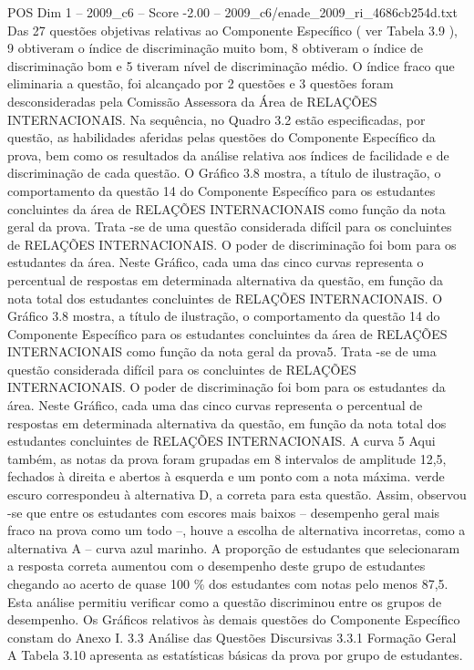 \begin{textsample}{POS Dim 1 – 2009\_c6 – Score -2.00 – 2009\_c6/enade\_2009\_ri\_4686cb254d.txt}
Das 27 questões objetivas relativas ao Componente Específico ( ver Tabela 3.9 ), 9 obtiveram o índice de discriminação muito bom, 8 obtiveram o índice de discriminação bom e 5 tiveram nível de discriminação médio.
O índice fraco que eliminaria a questão, foi alcançado por 2 questões e 3 questões foram desconsideradas pela Comissão Assessora da Área de RELAÇÕES INTERNACIONAIS.
Na sequência, no Quadro 3.2 estão especificadas, por questão, as habilidades aferidas pelas questões do Componente Específico da prova, bem como os resultados da análise relativa aos índices de facilidade e de discriminação de cada questão.
O Gráfico 3.8 mostra, a título de ilustração, o comportamento da questão 14 do Componente Específico para os estudantes concluintes da área de RELAÇÕES INTERNACIONAIS como função da nota geral da prova.
Trata -se de uma questão considerada difícil para os concluintes de RELAÇÕES INTERNACIONAIS.
O poder de discriminação foi bom para os estudantes da área.
Neste Gráfico, cada uma das cinco curvas representa o percentual de respostas em determinada alternativa da questão, em função da nota total dos estudantes concluintes de RELAÇÕES INTERNACIONAIS.
O Gráfico 3.8 mostra, a título de ilustração, o comportamento da questão 14 do Componente Específico para os estudantes concluintes da área de RELAÇÕES INTERNACIONAIS como função da nota geral da prova5.
Trata -se de uma questão considerada difícil para os concluintes de RELAÇÕES INTERNACIONAIS.
O poder de discriminação foi bom para os estudantes da área.
Neste Gráfico, cada uma das cinco curvas representa o percentual de respostas em determinada alternativa da questão, em função da nota total dos estudantes concluintes de RELAÇÕES INTERNACIONAIS.
A curva 5 Aqui também, as notas da prova foram grupadas em 8 intervalos de amplitude 12,5, fechados à direita e abertos à esquerda e um ponto com a nota máxima. verde escuro correspondeu à alternativa D, a correta para esta questão.
Assim, observou -se que entre os estudantes com escores mais baixos – desempenho geral mais fraco na prova como um todo –, houve a escolha de alternativa incorretas, como a alternativa A – curva azul marinho.
A proporção de estudantes que selecionaram a resposta correta aumentou com o desempenho deste grupo de estudantes chegando ao acerto de quase 100 \% dos estudantes com notas pelo menos 87,5.
Esta análise permitiu verificar como a questão discriminou entre os grupos de desempenho.
Os Gráficos relativos às demais questões do Componente Específico constam do Anexo I. 3.3 Análise das Questões Discursivas 3.3.1 Formação Geral A Tabela 3.10 apresenta as estatísticas básicas da prova por grupo de estudantes.

\end{textsample}
